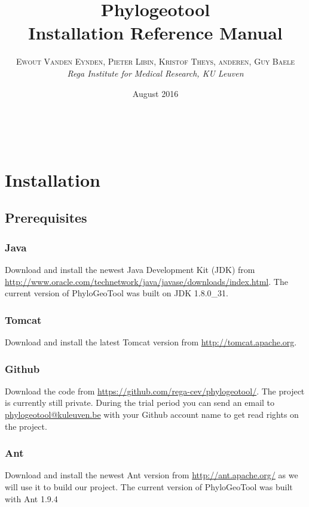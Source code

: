 \documentclass[a4paper, 11pt]{article} %
\title{\textbf{Phylogeotool}\\ %
Installation Reference Manual} %
\author{\textsc{Ewout Vanden Eynden, Pieter Libin, Kristof Theys, anderen, Guy Baele} %
\\{\textit{Rega Institute for Medical Research, KU Leuven}}} %
\date{August 2016} %
\makeatletter
\renewcommand{\maketitle}{ %
\begin{flushright} %
{\LARGE\@title} %

\vspace{50pt} %

{\large\@author} %
\\\@date %

\vspace{40pt} %
\end{flushright}
}
\makeatother
\begin{document}
\maketitle %

\vspace{30pt} %

\tableofcontents
\newpage

\section{Installation}

\subsection{Prerequisites}

\subsubsection*{Java}
Download and install the newest Java Development Kit (JDK) from \url{http://www.oracle.com/technetwork/java/javase/downloads/index.html}.
The current version of PhyloGeoTool was built on JDK 1.8.0\_31.

\subsubsection*{Tomcat}
Download and install the latest Tomcat version from \url{http://tomcat.apache.org}.

\subsubsection*{Github}
Download the code from \url{https://github.com/rega-cev/phylogeotool/}. 
The project is currently still private. 
During the trial period you can send an email to \href{mailto:phylogeotool@kuleuven.be}  {phylogeotool@kuleuven.be} with your Github account name to get read rights on the project.

\subsubsection*{Ant}
Download and install the newest Ant version from \url{http://ant.apache.org/} as we will use it to build our project.
The current version of PhyloGeoTool was built with Ant 1.9.4
\end{document}
